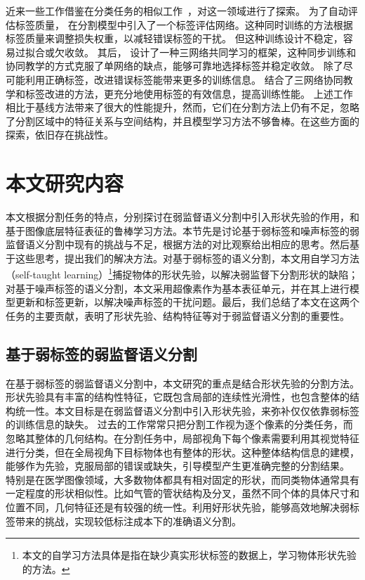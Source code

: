 近来一些工作借鉴在分类任务的相似工作~\citep{arpit2017closer,Han2018CoteachingRT,Wei2020CombatingNL}，对这一领域进行了探索。
为了自动评估标签质量，\citet{Zhu2019PickandLearnAQ} 在分割模型中引入了一个标签评估网络。这种同时训练的方法根据标签质量来调整损失权重，以减轻错误标签的干扰。
但这种训练设计不稳定，容易过拟合或欠收敛。
其后，\citet{Zhang2020RobustMI} 设计了一种三网络共同学习的框架，这种同步训练和协同教学的方式克服了单网络的缺点，能够可靠地选择标签并稳定收敛。
除了尽可能利用正确标签，改进错误标签能带来更多的训练信息。\citet{Xue2020CascadedRL} 结合了三网络协同教学和标签改进的方法，更充分地使用标签的有效信息，提高训练性能。
上述工作相比于基线方法带来了很大的性能提升，然而，它们在分割方法上仍有不足，忽略了分割区域中的特征关系与空间结构，并且模型学习方法不够鲁棒。在这些方面的探索，依旧存在挑战性。


\section{本文研究内容}
本文根据分割任务的特点，分别探讨在弱监督语义分割中引入形状先验的作用，和基于图像底层特征表征的鲁棒学习方法。本节先是讨论基于弱标签和噪声标签的弱监督语义分割中现有的挑战与不足，根据方法的对比观察给出相应的思考。然后基于这些思考，提出我们的解决方法。对基于弱标签的语义分割，本文用自学习方法（self-taught learning）\footnote{本文的自学习方法具体是指在缺少真实形状标签的数据上，学习物体形状先验的方法。}捕捉物体的形状先验，以解决弱监督下分割形状的缺陷；对基于噪声标签的语义分割，本文采用超像素作为基本表征单元，并在其上进行模型更新和标签更新，以解决噪声标签的干扰问题。最后，我们总结了本文在这两个任务的主要贡献，表明了形状先验、结构特征等对于弱监督语义分割的重要性。

\subsection{基于弱标签的弱监督语义分割}
在基于弱标签的弱监督语义分割中，本文研究的重点是结合形状先验的分割方法。形状先验具有丰富的结构性特征，它既包含局部的连续性光滑性，也包含整体的结构统一性。本文目标是在弱监督语义分割中引入形状先验，来弥补仅仅依靠弱标签的训练信息的缺失。
过去的工作常常只把分割工作视为逐个像素的分类任务，而忽略其整体的几何结构。在分割任务中，局部视角下每个像素需要利用其视觉特征进行分类，但在全局视角下目标物体也有整体的形状。这种整体结构信息的建模，能够作为先验，克服局部的错误或缺失，引导模型产生更准确完整的分割结果。
特别是在医学图像领域，大多数物体都具有相对固定的形状，而同类物体通常具有一定程度的形状相似性。比如气管的管状结构及分叉，虽然不同个体的具体尺寸和位置不同，几何特征还是有较强的统一性。利用好形状先验，能够高效地解决弱标签带来的挑战，实现较低标注成本下的准确语义分割。

